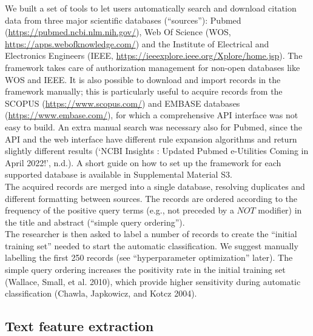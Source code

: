 \documentclass{article}
\begin{document}
We built a set of tools to let users automatically search and download
citation data from three major scientific databases (``sources''):
Pubmed (\url{https://pubmed.ncbi.nlm.nih.gov/}), Web Of Science (WOS,
\url{https://apps.webofknowledge.com/}) and the Institute of Electrical
and Electronics Engineers (IEEE,
\url{https://ieeexplore.ieee.org/Xplore/home.jsp}). The framework takes
care of authorization management for non-open databases like WOS and
IEEE. It is also possible to download and import records in the
framework manually; this is particularly useful to acquire records from
the SCOPUS (\url{https://www.scopus.com/}) and EMBASE databases
(\url{https://www.embase.com/}), for which a comprehensive API interface
was not easy to build. An extra manual search was necessary also for
Pubmed, since the API and the web interface have different rule
expansion algorithms and return slightly different results ({`NCBI
Insights : Updated Pubmed e-Utilities Coming in April 2022!'}, n.d.). A
short guide on how to set up the framework for each supported database
is available in Supplemental Material S3.\\
The acquired records are merged into a single database, resolving
duplicates and different formatting between sources. The records are
ordered according to the frequency of the positive query terms (e.g.,
not preceded by a \(NOT\) modifier) in the title and abstract (``simple
query ordering'').\\
The researcher is then asked to label a number of records to create the
``initial training set'' needed to start the automatic classification.
We suggest manually labelling the first 250 records (see
``hyperparameter optimization'' later). The simple query ordering
increases the positivity rate in the initial training set (Wallace,
Small, et al. 2010), which provide higher sensitivity during automatic
classification (Chawla, Japkowicz, and Kotcz 2004).

\hypertarget{text-feature-extraction}{%
\subsection{Text feature extraction}\label{text-feature-extraction}}
\end{document}
